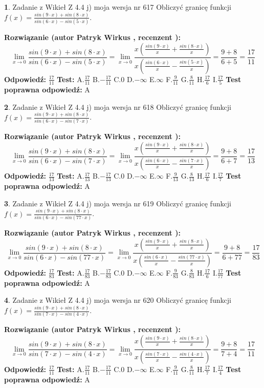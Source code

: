 \documentclass[12pt, a4paper]{article}
\theoremstyle{definition} %
\newtheorem{zad}{}
\newcommand{\zadStart}[1]{\begin{zad}#1\newline}
\newcommand{\zadStop}{\end{zad}}
\newcommand{\rozwStart}[2]{\noindent \textbf{Rozwiązanie (autor #1 , recenzent #2): }\newline}
\newcommand{\rozwStop}{\newline}
\newcommand{\odpStart}{\noindent \textbf{Odpowiedź:}\newline}
\newcommand{\odpStop}{\newline}
\newcommand{\testStart}{\noindent \textbf{Test:}\newline}
\newcommand{\testStop}{\newline}
\newcommand{\kluczStart}{\noindent \textbf{Test poprawna odpowiedź:}\newline}
\newcommand{\kluczStop}{\newline}
\begin{document}
\zadStart{Zadanie z Wikieł Z 4.4 j) moja wersja nr 617}
Obliczyć granicę funkcji $f(x)=\frac{sin(9\cdot x) +sin(8\cdot x)}{sin(6\cdot x) -sin(5\cdot x)}$.
\zadStop
\rozwStart{Patryk Wirkus}{}
$$\lim\limits_{x\to 0}\frac{sin(9\cdot x) +sin(8\cdot x)}{sin(6\cdot x) -sin(5\cdot x)}=\lim\limits_{x\to 0}\frac{x(\frac{sin(9\cdot x)}{x}+\frac{sin(8\cdot x)}{x})}{x(\frac{sin(6\cdot x)}{x}-\frac{sin(5\cdot x)}{x})}=\frac{9+8}{6+5} = \frac{17}{11}$$
\rozwStop
\odpStart
$\frac{17}{11}$
\odpStop
\testStart
A.$\frac{17}{11}$
B.$-\frac{17}{11}$
C.$0$
D.$-\infty$
E.$\infty$
F.$\frac{9}{11}$
G.$\frac{8}{11}$
H.$\frac{17}{6}$
I.$\frac{17}{5}$
\testStop
\kluczStart
A
\kluczStop



\zadStart{Zadanie z Wikieł Z 4.4 j) moja wersja nr 618}
Obliczyć granicę funkcji $f(x)=\frac{sin(9\cdot x) +sin(8\cdot x)}{sin(6\cdot x) -sin(7\cdot x)}$.
\zadStop
\rozwStart{Patryk Wirkus}{}
$$\lim\limits_{x\to 0}\frac{sin(9\cdot x) +sin(8\cdot x)}{sin(6\cdot x) -sin(7\cdot x)}=\lim\limits_{x\to 0}\frac{x(\frac{sin(9\cdot x)}{x}+\frac{sin(8\cdot x)}{x})}{x(\frac{sin(6\cdot x)}{x}-\frac{sin(7\cdot x)}{x})}=\frac{9+8}{6+7} = \frac{17}{13}$$
\rozwStop
\odpStart
$\frac{17}{13}$
\odpStop
\testStart
A.$\frac{17}{13}$
B.$-\frac{17}{13}$
C.$0$
D.$-\infty$
E.$\infty$
F.$\frac{9}{13}$
G.$\frac{8}{13}$
H.$\frac{17}{6}$
I.$\frac{17}{7}$
\testStop
\kluczStart
A
\kluczStop



\zadStart{Zadanie z Wikieł Z 4.4 j) moja wersja nr 619}
Obliczyć granicę funkcji $f(x)=\frac{sin(9\cdot x) +sin(8\cdot x)}{sin(6\cdot x) -sin(77\cdot x)}$.
\zadStop
\rozwStart{Patryk Wirkus}{}
$$\lim\limits_{x\to 0}\frac{sin(9\cdot x) +sin(8\cdot x)}{sin(6\cdot x) -sin(77\cdot x)}=\lim\limits_{x\to 0}\frac{x(\frac{sin(9\cdot x)}{x}+\frac{sin(8\cdot x)}{x})}{x(\frac{sin(6\cdot x)}{x}-\frac{sin(77\cdot x)}{x})}=\frac{9+8}{6+77} = \frac{17}{83}$$
\rozwStop
\odpStart
$\frac{17}{83}$
\odpStop
\testStart
A.$\frac{17}{83}$
B.$-\frac{17}{83}$
C.$0$
D.$-\infty$
E.$\infty$
F.$\frac{9}{83}$
G.$\frac{8}{83}$
H.$\frac{17}{6}$
I.$\frac{17}{77}$
\testStop
\kluczStart
A
\kluczStop



\zadStart{Zadanie z Wikieł Z 4.4 j) moja wersja nr 620}
Obliczyć granicę funkcji $f(x)=\frac{sin(9\cdot x) +sin(8\cdot x)}{sin(7\cdot x) -sin(4\cdot x)}$.
\zadStop
\rozwStart{Patryk Wirkus}{}
$$\lim\limits_{x\to 0}\frac{sin(9\cdot x) +sin(8\cdot x)}{sin(7\cdot x) -sin(4\cdot x)}=\lim\limits_{x\to 0}\frac{x(\frac{sin(9\cdot x)}{x}+\frac{sin(8\cdot x)}{x})}{x(\frac{sin(7\cdot x)}{x}-\frac{sin(4\cdot x)}{x})}=\frac{9+8}{7+4} = \frac{17}{11}$$
\rozwStop
\odpStart
$\frac{17}{11}$
\odpStop
\testStart
A.$\frac{17}{11}$
B.$-\frac{17}{11}$
C.$0$
D.$-\infty$
E.$\infty$
F.$\frac{9}{11}$
G.$\frac{8}{11}$
H.$\frac{17}{7}$
I.$\frac{17}{4}$
\testStop
\kluczStart
A
\kluczStop
\end{document}
